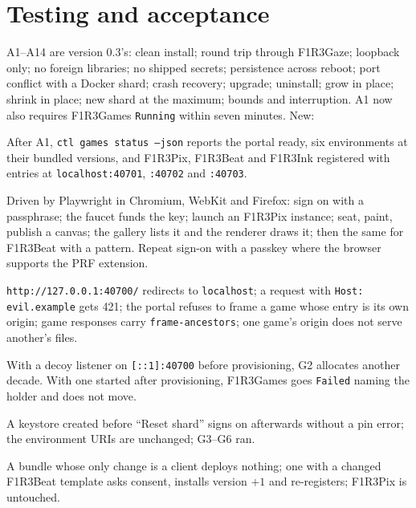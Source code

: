 \documentclass[11pt]{article}
\theoremstyle{definition}
\theoremstyle{remark}
\newcommand{\code}[1]{\texttt{#1}}
\newcommand{\Gz}{F1R3Gaze}
\newcommand{\Gm}{F1R3Games}
\begin{document}
\section{Testing and acceptance}\label{sec:accept}

A1--A14 are version 0.3's: clean install; round trip through \Gz{}; loopback only; no
foreign libraries; no shipped secrets; persistence across reboot; port conflict with
a Docker shard; crash recovery; upgrade; uninstall; grow in place; shrink in place;
new shard at the maximum; bounds and interruption. A1 now also requires \Gm{}
\code{Running} within seven minutes. New:

\begin{description}[leftmargin=1.5em,style=nextline,itemsep=2pt]
\item[A15 \Gm{} installed.] After A1, \code{ctl games status --json} reports the
  portal ready, six environments at their bundled versions, and F1R3Pix, F1R3Beat and
  F1R3Ink registered with entries at \code{localhost:40701}, \code{:40702} and
  \code{:40703}.
\item[A16 Playing in a stock browser.] Driven by Playwright in Chromium, WebKit and
  Firefox: sign on with a passphrase; the faucet funds the key; launch an F1R3Pix
  instance; seat, paint, publish a canvas; the gallery lists it and the renderer
  draws it; then the same for F1R3Beat with a pattern. Repeat sign-on with a passkey
  where the browser supports the PRF extension.
\item[A17 Origins.] \code{http://127.0.0.1:40700/} redirects to \code{localhost}; a
  request with \code{Host: evil.example} gets 421; the portal refuses to frame a game
  whose entry is its own origin; game responses carry \code{frame-ancestors}; one
  game's origin does not serve another's files.
\item[A18 Dual stack.] With a decoy listener on \code{[::1]:40700} before
  provisioning, G2 allocates another decade. With one started after provisioning,
  \Gm{} goes \code{Failed} naming the holder and does not move.
\item[A19 Reset keeps identities.] A keystore created before ``Reset shard'' signs on
  afterwards without a pin error; the environment URIs are unchanged; G3--G6 ran.
\item[A20 Upgrades.] A bundle whose only change is a client deploys nothing; one with
  a changed F1R3Beat template asks consent, installs version $+1$ and re-registers;
  F1R3Pix is untouched.

\end{description}
\end{document}
